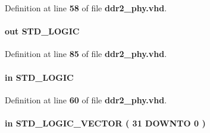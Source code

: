 Definition at line {\bf 58} of file {\bf ddr2\+\_\+phy.\+vhd}.

\paragraph[{dbg\+\_\+waitrequest}]{ {\bfseries \textcolor{keywordflow}{out}\textcolor{vhdlchar}{ }} {\bfseries \textcolor{comment}{S\+T\+D\+\_\+\+L\+O\+G\+IC}\textcolor{vhdlchar}{ }} \hspace{0.3cm}{\ttfamily [Port]}}\label{classddr2__phy_a29a3f7c2b6db094e6ad99af9000bcea4}


Definition at line {\bf 85} of file {\bf ddr2\+\_\+phy.\+vhd}.

\paragraph[{dbg\+\_\+wr}]{ {\bfseries \textcolor{keywordflow}{in}\textcolor{vhdlchar}{ }} {\bfseries \textcolor{comment}{S\+T\+D\+\_\+\+L\+O\+G\+IC}\textcolor{vhdlchar}{ }} \hspace{0.3cm}{\ttfamily [Port]}}\label{classddr2__phy_ae0e3b3347c1b3a10dbe820003eb84768}


Definition at line {\bf 60} of file {\bf ddr2\+\_\+phy.\+vhd}.

\paragraph[{dbg\+\_\+wr\+\_\+data}]{ {\bfseries \textcolor{keywordflow}{in}\textcolor{vhdlchar}{ }} {\bfseries \textcolor{comment}{S\+T\+D\+\_\+\+L\+O\+G\+I\+C\+\_\+\+V\+E\+C\+T\+OR}\textcolor{vhdlchar}{ }\textcolor{vhdlchar}{(}\textcolor{vhdlchar}{ }\textcolor{vhdlchar}{ } \textcolor{vhdldigit}{31} \textcolor{vhdlchar}{ }\textcolor{keywordflow}{D\+O\+W\+N\+TO}\textcolor{vhdlchar}{ }\textcolor{vhdlchar}{ } \textcolor{vhdldigit}{0} \textcolor{vhdlchar}{ }\textcolor{vhdlchar}{)}\textcolor{vhdlchar}{ }} \hspace{0.3cm}{\ttfamily [Port]}}\label{classddr2__phy_a01fabb790e7758b070c84a475f73ad92}



